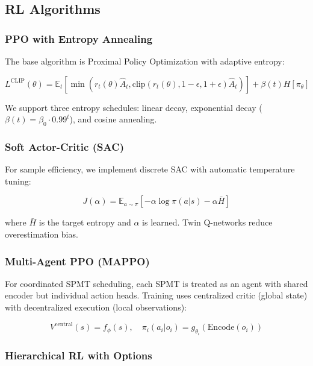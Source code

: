 \documentclass[11pt,a4paper]{article}
\newcommand{\E}{\mathbb{E}}
\begin{document}
\subsection{RL Algorithms}

\subsubsection{PPO with Entropy Annealing}

The base algorithm is Proximal Policy Optimization with adaptive entropy:

\begin{equation}
L^{\text{CLIP}}(\theta) = \E_t \left[ \min \left( r_t(\theta) \hat{A}_t, \text{clip}(r_t(\theta), 1-\epsilon, 1+\epsilon) \hat{A}_t \right) \right] + \beta(t) H[\pi_\theta]
\end{equation}

We support three entropy schedules: linear decay, exponential decay ($\beta(t) = \beta_0 \cdot 0.99^t$), and cosine annealing.

\subsubsection{Soft Actor-Critic (SAC)}

For sample efficiency, we implement discrete SAC with automatic temperature tuning:

\begin{equation}
J(\alpha) = \E_{a \sim \pi} \left[ -\alpha \log \pi(a|s) - \alpha \bar{H} \right]
\end{equation}

where $\bar{H}$ is the target entropy and $\alpha$ is learned. Twin Q-networks reduce overestimation bias.

\subsubsection{Multi-Agent PPO (MAPPO)}

For coordinated SPMT scheduling, each SPMT is treated as an agent with shared encoder but individual action heads. Training uses centralized critic (global state) with decentralized execution (local observations):

\begin{equation}
V^{\text{central}}(s) = f_\phi(s), \quad \pi_i(a_i | o_i) = g_{\theta_i}(\text{Encode}(o_i))
\end{equation}

\subsubsection{Hierarchical RL with Options}
\end{document}
